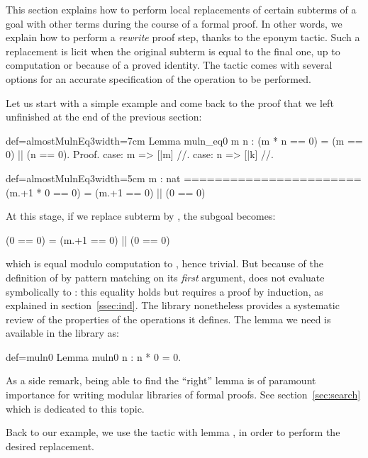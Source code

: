 This section explains how to perform local replacements of certain
subterms of a goal with other terms during the course of a formal
proof. In other words, we explain how to perform a
\emph{rewrite} proof step, thanks to the eponym  tactic.
Such a replacement is licit when the original subterm is equal
to the final one, up to computation or because of a proved
identity. The  tactic comes with several options for
an accurate specification of the operation to be performed.

Let us start with a simple example and come back to the proof that we
left unfinished at the end of the previous section:

\begin{coq}{def=almostMulnEq3}{width=7cm}
Lemma muln_eq0 m n :
  (m * n == 0) = (m == 0) || (n == 0).
Proof.
case: m => [|m] //.
case: n => [|k] //.
\end{coq}
\begin{coqout}{def=almostMulnEq3}{width=5cm}
m : nat
=======================
(m.+1 * 0 == 0) =
  (m.+1 == 0) || (0 == 0)
\end{coqout}
At this stage, if we replace subterm  by , the
subgoal becomes:

\begin{coqout}{}{}
(0 == 0) = (m.+1 == 0) || (0 == 0)
\end{coqout}
which is equal modulo computation to , hence trivial.
But because of
the definition of  by pattern matching on its \emph{first}
argument,  does not evaluate symbolically to : this
equality holds but requires a proof by induction, as explained in
section~\ref{ssec:ind}.
The \mcbMC{} library nonetheless provides a systematic review of the
properties of the operations it defines. The lemma we need is
available in the library as:

\begin{coq}{def=muln0}{}
Lemma muln0 n : n * 0 = 0.
\end{coq}

As a side remark, being able to find the ``right'' lemma is of
paramount importance for writing modular libraries of formal
proofs. See section~\ref{sec:search} which is dedicated to this topic.

Back to our example, we use the  tactic with lemma
, in order to perform the desired replacement.

